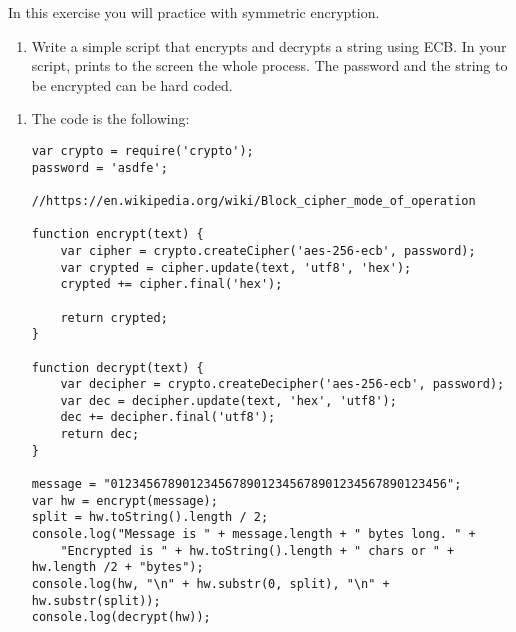 
\begin{Exercise}[label={basic-js-crypto-aes}]
In this exercise you will practice with symmetric encryption.

\begin{enumerate}[1.]
\item Write a simple script that encrypts and decrypts a string using ECB.
In your script, prints to the screen the whole process. 
The password and the string to be encrypted can be hard coded.
\end{enumerate}

\end{Exercise}

\begin{Answer}[ref={basic-js-crypto-aes}]
\begin{enumerate}[1.]
\item The code is the following: 

\begin{lstlisting}[style=JavaScript]
var crypto = require('crypto');
password = 'asdfe';

//https://en.wikipedia.org/wiki/Block_cipher_mode_of_operation

function encrypt(text) {
    var cipher = crypto.createCipher('aes-256-ecb', password);
    var crypted = cipher.update(text, 'utf8', 'hex');
    crypted += cipher.final('hex');

    return crypted;
}

function decrypt(text) {
    var decipher = crypto.createDecipher('aes-256-ecb', password);
    var dec = decipher.update(text, 'hex', 'utf8');
    dec += decipher.final('utf8');
    return dec;
}

message = "01234567890123456789012345678901234567890123456";
var hw = encrypt(message);
split = hw.toString().length / 2;
console.log("Message is " + message.length + " bytes long. " +
    "Encrypted is " + hw.toString().length + " chars or " + hw.length /2 + "bytes");
console.log(hw, "\n" + hw.substr(0, split), "\n" + hw.substr(split));
console.log(decrypt(hw));
\end{lstlisting}

\end{enumerate}
\end{Answer}
